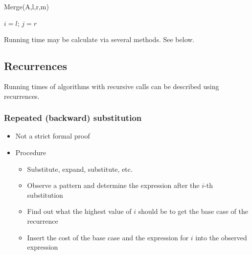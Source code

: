 \begin{center}
\begin{minipage}{0.6\textwidth} %
\centering %
\begin{algorithm}[H]
\caption{Merge(A,l,r,m)}
$i = l$; $j = r$\;
\end{algorithm}
\end{minipage}
\end{center}

Running time may be calculate via several methods. See below.


\subsection{Recurrences}

Running times of algorithms with recursive calls can be described using recurrences.\\

\subsubsection{Repeated (backward) substitution}
\begin{itemize}
    \item Not a strict formal proof
    \item Procedure
    \begin{itemize}
        \item Substitute, expand, substitute, etc.
        \item Observe a pattern and determine the expression after the $i$-th substitution
        \item Find out what the highest value of $i$ should be to get the base case of the recurrence
        \item Insert the cost of the base case and the expression for $i$ into the observed expression
    \end{itemize}
\end{itemize}

